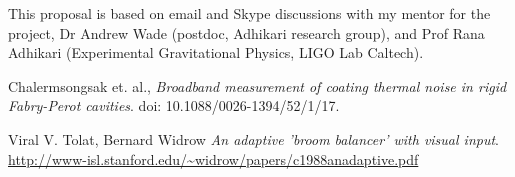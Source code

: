 \documentclass[colorlinks=true,pdfstartview=FitV,linkcolor=blue,
            citecolor=red,urlcolor=magenta]{ligodoc}
\begin{document}
 


\begin{thebibliography}{9}
      
     This proposal is based on email and Skype discussions with my mentor for the project, Dr Andrew Wade (postdoc, Adhikari research group), and Prof Rana Adhikari (Experimental Gravitational Physics, LIGO Lab Caltech).
     
	  Chalermsongsak et. al.,
	  \emph{Broadband measurement of coating thermal noise in rigid Fabry-Perot cavities}.
	doi: 10.1088/0026-1394/52/1/17.    
      
	Viral V. Tolat, Bernard Widrow
	\emph{An adaptive 'broom balancer' with visual input}. 
	\url{http://www-isl.stanford.edu/~widrow/papers/c1988anadaptive.pdf}      
      
 
\end{thebibliography} %
\end{document}
